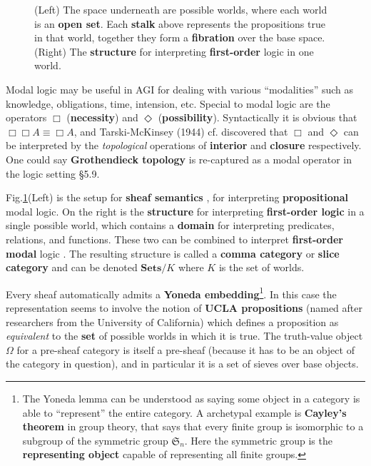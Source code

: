 \documentclass[runningheads]{llncs}
\begin{document}
\begin{figure}
	\caption{(Left) The space underneath are possible worlds, where each world is an \textbf{open set}. Each \textbf{stalk} above represents the propositions true in that world, together they form a \textbf{fibration} over the base space. (Right) The \textbf{structure} for interpreting \textbf{first-order} logic in one world.}
	\label{fig:possible-worlds-as-sheaf}
\end{figure}

Modal logic \cite{Goble2001} \cite{Popkorn1994} may be useful in AGI for dealing with various ``modalities'' such as knowledge, obligations, time, intension, etc.  Special to modal logic are the operators $\Box$ (\textbf{necessity}) and $\Diamond$ (\textbf{possibility}).  Syntactically it is obvious that $\Box \Box A \equiv \Box A$, and Tarski-McKinsey (1944) cf. \cite{Dunn2001} discovered that $\Box$ and $\Diamond$ can be interpreted by the \textit{topological} operations of \textbf{interior} and \textbf{closure} respectively.  %
One could say \textbf{Grothendieck topology} is re-captured as a modal operator in the logic setting \cite{Rodin2014} \S5.9.

Fig.\ref{fig:possible-worlds-as-sheaf}(Left) is the setup for \textbf{sheaf semantics} \cite{Goldblatt1984} \cite{Bell1988}, for interpreting \textbf{propositional} modal logic.   On the right is the \textbf{structure} for interpreting \textbf{first-order logic} in a single possible world, which contains a \textbf{domain} for interpreting predicates, relations, and functions.  These two can be combined to interpret \textbf{first-order modal} logic \cite{Awodey2007} \cite{Awodey2014}. The resulting structure is called a \textbf{comma category} \cite{MacLane1997} or \textbf{slice category} and can be denoted $\mathbf{Sets}/K$ where $K$ is the set of worlds.

Every sheaf automatically admits a \textbf{Yoneda embedding}\footnote{The Yoneda lemma can be understood as saying some object in a category is able to ``represent'' the entire category.  A archetypal example is \textbf{Cayley's theorem} in group theory, that says that every finite group is isomorphic to a subgroup of the symmetric group $\mathfrak{S}_n$. Here the symmetric group is the \textbf{representing object} capable of representing all finite groups.}.  In this case the representation seems to involve the notion of \textbf{UCLA propositions} \cite{Dunn2001} (named after researchers from the University of California) which defines a proposition as \textit{equivalent} to the \textbf{set} of possible worlds in which it is true. The truth-value object $\Omega$ for a pre-sheaf category is itself a pre-sheaf (because it has to be an object of the category in question), and in particular it is a set of sieves over base objects.  
\end{document}
